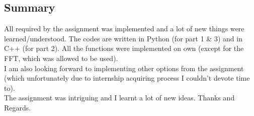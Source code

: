 \documentclass{article}
\begin{document}
    \subsection*{Summary}
    All required by the assignment was implemented and a lot of new things were learned/understood. The codes are written in Python (for part 1 \& 3) and in C++ (for part 2). All the functions were implemented on own (except for the FFT, which was allowed to be used). \\
    I am also looking forward to implementing other options from the assignment (which unfortunately due to internship acquiring process I couldn't devote time to).\\
    The assignment was intriguing and I learnt a lot of new ideas. Thanks and Regards.
    
\end{document}
